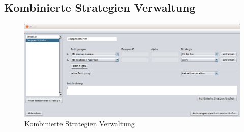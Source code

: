 \pagebreak

\subsection{Kombinierte Strategien Verwaltung}


\begin{figure}[hp]
  \centering
     \includegraphics[width=1.15\textwidth]{GUI_Entwurf/StrategienMenue.png}
  \caption{Kombinierte Strategien Verwaltung}
  \label{fig:Bild1}
\end{figure}

